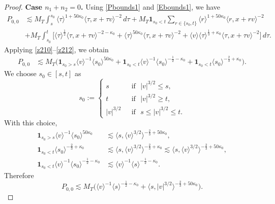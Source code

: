 \documentclass[10pt,a4paper]{amsart}
\theoremstyle{plain}
\begin{document}
\begin{proof}
	
	{\bf{Case $n_1+n_2=0$.}} Using \eqref{Pbounds1} and \eqref{Ebounds1}, we have
	\begin{align*}
		P_{0,0}&\lesssim
		M_T\int_s^{s_0}\langle \tau\rangle^{1+50\kappa_0}
		\langle \tau,x+\tau v\rangle^{-2}\,d\tau+M_T\mathbf 1_{s_0<t}\sum_{r\in\{s_0,t\}}
		\langle r\rangle^{1+50\kappa_0}
		\langle r,x+rv\rangle^{-2}\\
		&+M_T\int_{s_0}^{t}\Big[
		\langle \tau\rangle^{\frac12}
		\langle \tau,x+\tau v\rangle^{-2-\kappa_0}+
		\langle \tau\rangle^{50\kappa_0}
		\langle \tau,x+\tau v\rangle^{-2}+
		\langle v\rangle
		\langle \tau\rangle^{\frac13+\kappa_0}
		\langle \tau,x+\tau v\rangle^{-2}
		\Big]\,d\tau .
	\end{align*}
	Applying \eqref{z210}--\eqref{z212}, we obtain
	\begin{align}
		P_{0,0}&\lesssim M_T\big(\mathbf 1_{s_0>s}\langle v\rangle^{-1}
		\langle s_0\rangle^{50\kappa_0}+\mathbf 1_{s_0<t}
		\langle v\rangle^{-1}
		\langle s_0\rangle^{-\frac12-\kappa_0}+\mathbf 1_{s_0<t}
		\langle s_0\rangle^{-\frac23+\kappa_0}\big).
		\label{P00-pre}
	\end{align}
	We choose $s_0\in[s,t]$ as 
	\begin{equation}\label{choice-s0-P00}
		s_0:=\begin{cases}
			s\qquad&\text{ if }\,\,|v|^{3/2}\leq s,\\
			t\qquad&\text{ if }\,\,|v|^{3/2}\geq t,\\
			|v|^{3/2}&\text{ if }\,\,s\leq |v|^{3/2}\leq t.
		\end{cases}		
	\end{equation}
	With this choice,
	\begin{align*}
		\mathbf 1_{s_0>s}
		\langle v\rangle^{-1}
		\langle s_0\rangle^{50\kappa_0}
		&\lesssim
		\langle s,\langle v\rangle^{3/2}\rangle^{-\frac23+50\kappa_0},\\
		\mathbf 1_{s_0<t}\langle s_0\rangle^{-\frac23+\kappa_0}
		&\lesssim
		\langle s,\langle v\rangle^{3/2}\rangle^{-\frac23+\kappa_0}\lesssim
		\langle s,\langle v\rangle^{3/2}\rangle^{-\frac23+50\kappa_0},\\
		\mathbf 1_{s_0<t}
		\langle v\rangle^{-1}
		\langle s_0\rangle^{-\frac12-\kappa_0}
		&\lesssim
		\langle v\rangle^{-1}
		\langle s\rangle^{-\frac12-\kappa_0}.
	\end{align*}
	Therefore
	\begin{equation}\label{q60}
		P_{0,0}\lesssim M_T\big(\langle v\rangle^{-1}\langle s\rangle^{-\frac12-\kappa_0}+
		\langle s,|v|^{3/2}\rangle^{-\frac23+50\kappa_0}\big).
	\end{equation}
	

\end{proof}
\end{document}
